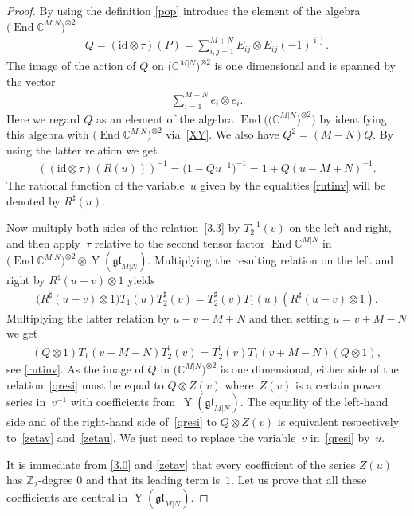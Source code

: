 \documentclass[pdftex]{sigma}
\numberwithin{equation}{section}
\def\1{^{-1}}
\def\bi{{\bar\imath }}
\def\bj{{\bar\jmath }}
\def\CC{{\mathbb{C}}}
\def\CMN{\CC^{M|N}}
\def\End{\operatorname{End}}
\def\glMN{\mathfrak{gl}_{M|N}}
\def\id{{\mathrm{id}}}
\def\ot{\otimes}
\def\RS{R^{\sharp}}
\def\TS{T^{\sharp}}
\def\YMN{\operatorname{Y}(\glMN)}
\def\ZZ{\mathbb{Z}}
\begin{document}
\begin{proof}By using the definition \eqref{pop} introduce the element of
the algebra $\big(\End\CMN\big)^{\ot 2}$
\begin{gather}\label{Q}
Q=( \id\ot\tau ) ( P )=\sum_{i,j=1}^{M+N}E_{ij}\ot E_{ij} {(-1)}^{\bi \bj} .
\end{gather}
The image of the action of $Q$ on $\big(\CMN\big)^{\ot 2}$ is one dimensional and is spanned by the vector
\begin{gather*}
\sum_{i=1}^{M+N}e_{i}\ot e_{i} .
\end{gather*}
Here we regard $Q$ as an element of the algebra
$\End\big(\big(\CMN\big)^{\ot 2}\big)$
by identifying this algebra with $\big(\End\CMN\big)^{\ot 2}$ via~\eqref{XY}.
We also have
$Q^{2}=(M-N) Q $. By using the latter relation we get
\begin{gather}\label{rutinv}
(( \id\ot\tau ) ( R(u) ))^{-1}=\big( 1-Q u\1\big)^{-1}=
1+Q ( u-M+N )^{-1} .
\end{gather}
The rational function of the variable~$u$
given by the equalities \eqref{rutinv} will be denoted by $\RS(u) $.

Now multiply both sides of the relation~\eqref{3.3}
by $T_2^{-1}(v)$ on the left and right, and then apply~$\tau$ relative
to the second tensor factor $\End\CMN$ in $\big(\End\CMN\big)^{\ot2}\ot\YMN $.
Multiplying the resulting relation on the left and right by
$\RS(u-v)\ot 1$ yields
\begin{gather}\label{trater}
\big(\RS(u-v)\ot1\big) T_1(u) \TS_2(v)=\TS_2(v) T_1(u)(\RS(u-v)\ot1) .
\end{gather}
Multiplying the latter relation by $u-v-M+N$ and then setting
$u=v+M-N$ we get
\begin{gather}\label{qresi}
(Q\ot1) T_1(v+M-N) \TS_2(v)= \TS_2(v) T_1(v+M-N) (Q\ot1) ,
\end{gather}
see \eqref{rutinv}.
As the image of $Q$ in $\big(\CMN\big)^{\ot 2}$
is one dimensional, either side of the relation~\eqref{qresi}
must be equal to $Q\ot Z(v)$ where~$Z(v)$
is a certain power series in~$v^{-1}$
with coefficients from~$\YMN $.
The equality
of the left-hand side and of the right-hand side of~\eqref{qresi}
to $Q\ot Z(v)$
is equivalent respectively to~\eqref{zetav} and~\eqref{zetau}.
We just need to replace the variable~$v$ in~\eqref{qresi} by~$u $.

It is immediate from \eqref{3.0} and \eqref{zetav} that
every coefficient of the series $Z(u)$ has
$\ZZ_{2}$-degree $0$ and that its leading
term is~$1 $.
Let us prove that all these coefficients
are central in $\YMN $.


\end{proof}
\end{document}
